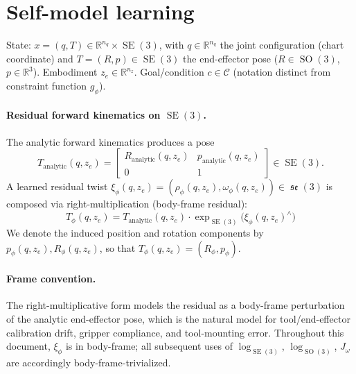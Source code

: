\documentclass[11pt,a4paper]{article}
\DeclareMathOperator{\SE}{SE}
\DeclareMathOperator{\SO}{SO}
\DeclareMathOperator{\se}{\mathfrak{se}}
\newcommand{\R}{\mathbb{R}}
\newcommand{\Tphi}{T_\phi}
\begin{document}
\section{Self-model learning}

State: $x = (q, T) \in \R^{n_q} \times \SE(3)$, with $q \in \R^{n_q}$ the joint configuration (chart coordinate) and $T = (R, p) \in \SE(3)$ the end-effector pose ($R \in \SO(3)$, $p \in \R^3$). Embodiment $z_e \in \R^{n_z}$. Goal/condition $c \in \mathcal{C}$ (notation distinct from constraint function $g_\phi$).

\paragraph{Residual forward kinematics on $\SE(3)$.} The analytic forward kinematics produces a pose
\begin{equation}
T_{\text{analytic}}(q, z_e) = \begin{bmatrix} R_{\text{analytic}}(q, z_e) & p_{\text{analytic}}(q, z_e) \\ 0 & 1 \end{bmatrix} \in \SE(3).
\end{equation}
A learned residual twist $\xi_\phi(q, z_e) = (\rho_\phi(q, z_e), \omega_\phi(q, z_e)) \in \se(3)$ is composed via right-multiplication (body-frame residual):
\begin{equation}
\boxed{ \Tphi(q, z_e) = T_{\text{analytic}}(q, z_e) \cdot \exp_{\SE(3)}\!\bigl(\xi_\phi(q, z_e)^\wedge\bigr) }
\end{equation}
We denote the induced position and rotation components by $p_\phi(q, z_e), R_\phi(q, z_e)$, so that $\Tphi(q, z_e) = (R_\phi, p_\phi)$.

\paragraph{Frame convention.} The right-multiplicative form models the residual as a body-frame perturbation of the analytic end-effector pose, which is the natural model for tool/end-effector calibration drift, gripper compliance, and tool-mounting error. Throughout this document, $\xi_\phi$ is in body-frame; all subsequent uses of $\log_{\SE(3)}$, $\log_{\SO(3)}$, $J_\omega$ are accordingly body-frame-trivialized.
\end{document}
